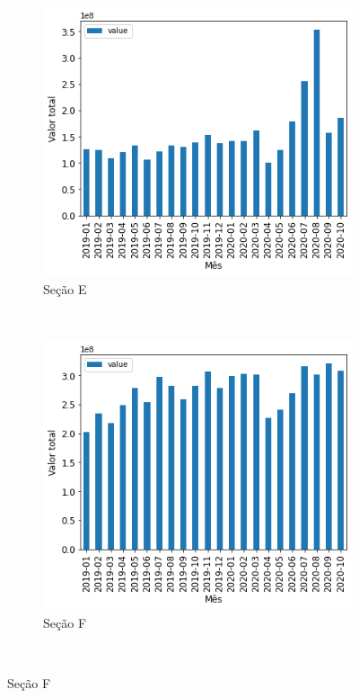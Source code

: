 \begin{figure}[htb]
\begin{subfigure}[b]{0.45\textwidth}
        \includegraphics[scale=0.45]{images/base-de-dados-16.E-valor-mensal-por-secao.png}
        \caption{Seção E}
        \label{fig:pandemia:descritiva-16.E-valor-mensal-por-secao}
    \end{subfigure} ~ \quad
    \begin{subfigure}[b]{0.45\textwidth}
        \includegraphics[scale=0.45]{images/base-de-dados-16.F-valor-mensal-por-secao.png}
        \caption{Seção F}
        \label{fig:pandemia:descritiva-16.F-valor-mensal-por-secao}
    \end{subfigure} ~ \\
    \fautor
\end{figure}

